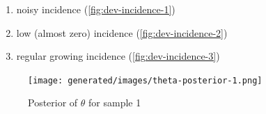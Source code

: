 \documentclass[
  digital, %
  oneside, %
  lof,     %
  lot,     %
]{fithesis4}
\begin{document}
\begin{enumerate}
  \item noisy incidence (\ref{fig:dev-incidence-1})
  \item low (almost zero) incidence (\ref{fig:dev-incidence-2})
  \item regular growing incidence (\ref{fig:dev-incidence-3})
\end{enumerate}

\begin{figure}[h]
  \begin{center}
    \texttt{[image: generated/images/theta-posterior-1.png]}
  \end{center}
  \caption{Posterior of $\theta$ for sample 1}
  \label{fig:theta-posterior-1}
\end{figure}




\end{document}
